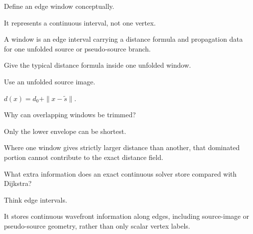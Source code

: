 \begin{exercise}\label{exr:vii39-18}
Define an edge window conceptually.
\end{exercise}

\begin{hint}
It represents a continuous interval, not one vertex.
\end{hint}

\begin{solution}
A window is an edge interval carrying a distance formula and propagation data for one unfolded source or pseudo-source branch.
\end{solution}

\begin{exercise}\label{exr:vii39-19}
Give the typical distance formula inside one unfolded window.
\end{exercise}

\begin{hint}
Use an unfolded source image.
\end{hint}

\begin{solution}
\(d(x)=d_0+\|x-\widetilde s\|\).
\end{solution}

\begin{exercise}\label{exr:vii39-20}
Why can overlapping windows be trimmed?
\end{exercise}

\begin{hint}
Only the lower envelope can be shortest.
\end{hint}

\begin{solution}
Where one window gives strictly larger distance than another, that dominated portion cannot contribute to the exact distance field.
\end{solution}

\begin{exercise}\label{exr:vii39-21}
What extra information does an exact continuous solver store compared with Dijkstra?
\end{exercise}

\begin{hint}
Think edge intervals.
\end{hint}

\begin{solution}
It stores continuous wavefront information along edges, including source-image or pseudo-source geometry, rather than only scalar vertex labels.
\end{solution}

